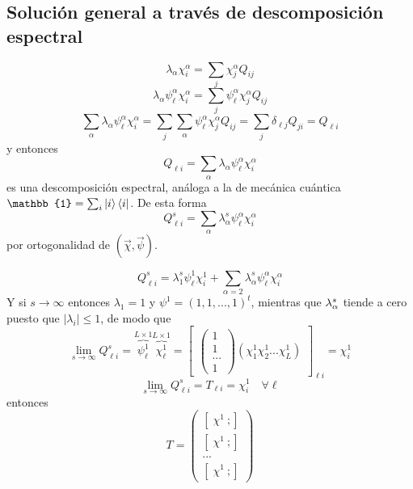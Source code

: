 \documentclass[10pt,oneside]{CBFT_book}
\begin{document}
\subsection{Solución general a través de descomposición espectral}

\[
	\lambda_\alpha \chi_i^\alpha = \sum_j \chi_j^\alpha Q_{ij} 
\]
\[
	\lambda_\alpha \psi_\ell^\alpha \chi_i^\alpha = \sum_j \psi_\ell^\alpha\chi_j^\alpha Q_{ij} 
\]
\[
	\sum_\alpha \lambda_\alpha \psi_\ell^\alpha \chi_i^\alpha = 
	\sum_j \sum_\alpha \psi_\ell^\alpha\chi_j^\alpha Q_{ij} =
	\sum_j \delta_{\ell j} Q_{ji} = Q_{\ell i}
\]
y entonces 
\[
	Q_{\ell i} = \sum_\alpha \lambda_\alpha \psi_\ell^\alpha \chi_i^\alpha
\]
es una descomposición espectral, análoga a la de mecánica cuántica $\mathbb{1} = \sum_i \Ket{i}\Bra{i}$.
De esta forma 
\[
	Q_{\ell i}^s = \sum_\alpha \lambda_\alpha^s \psi_\ell^\alpha \chi_i^\alpha
\]
por ortogonalidad de $( \vec{\chi}, \vec{\psi} )$.

\[
	Q_{\ell i}^s = \lambda_1^s \psi_\ell^1 \chi_i^1 + 
	\sum_{\alpha=2} \lambda_\alpha^s \psi_\ell^\alpha \chi_i^\alpha
\]
Y si $s \to \infty$ entonces $\lambda_1 = 1$ y $\psi^1 = (1,1,...,1)^t$, mientras que
$\lambda^s_{\alpha}$ tiende a cero puesto que $ |\lambda_i| \leq 1$, de modo que 
\[
	\lim_{s\to \infty} Q^s_{\ell i} = \overbrace{\psi_\ell^1}^{L\times 1} 
	\overbrace{\chi_\ell^1}^{L\times 1} = \begin{bmatrix}
	                                       \begin{pmatrix}
	                                        1 \\
	                                        1 \\ 
	                                        ... \\
	                                        1
	                                       \end{pmatrix}
						(\chi_1^1 \chi_2^1 ... \chi_L^1 )
	                                      \end{bmatrix}_{\ell i}
	= \chi_i^1
\]
\[
	\lim_{s\to \infty} Q^s_{\ell i} = T_{\ell i} = \chi_i^1 \quad \forall \ell
\]
entonces
\[
	T = \begin{pmatrix}
	     [ \; \chi^1 \ ; ] \\
	     [ \; \chi^1 \ ; ] \\
	     ...\\
	     [ \; \chi^1 \ ; ]
	    \end{pmatrix}
\]
\end{document}
